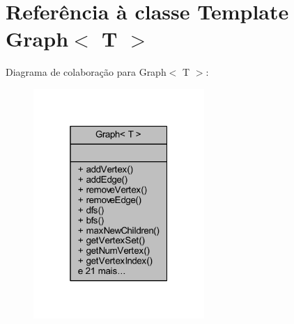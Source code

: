 \hypertarget{class_graph}{}\section{Referência à classe Template Graph$<$ T $>$}
\label{class_graph}


Diagrama de colaboração para Graph$<$ T $>$\+:
\nopagebreak
\begin{figure}[H]
\begin{center}
\leavevmode
\includegraphics[width=184pt]{class_graph__coll__graph}
\end{center}
\end{figure}
